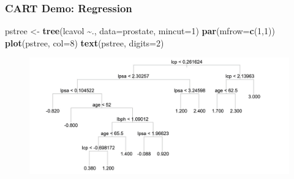\documentclass[
  shownotes,
  xcolor={svgnames},
  hyperref={colorlinks,citecolor=DarkBlue,linkcolor=DarkRed,urlcolor=DarkBlue}
  ]{beamer}
\newenvironment{Shaded}{\begin{snugshade}}{\end{snugshade}}
\newcommand{\DataTypeTok}[1]{\textcolor[rgb]{0.13,0.29,0.53}{#1}}
\newcommand{\DecValTok}[1]{\textcolor[rgb]{0.00,0.00,0.81}{#1}}
\newcommand{\KeywordTok}[1]{\textcolor[rgb]{0.13,0.29,0.53}{\textbf{#1}}}
\newcommand{\NormalTok}[1]{#1}
\newcommand{\OperatorTok}[1]{\textcolor[rgb]{0.81,0.36,0.00}{\textbf{#1}}}
\newcommand{\StringTok}[1]{\textcolor[rgb]{0.31,0.60,0.02}{#1}}
\begin{document}
\begin{frame}[fragile]
\frametitle{CART Demo: Regression}

\begin{scriptsize}
\begin{Shaded}
\begin{Highlighting}[]
\NormalTok{pstree \textless{}{-}}\StringTok{ }\KeywordTok{tree}\NormalTok{(lcavol }\OperatorTok{\textasciitilde{}}\NormalTok{., }\DataTypeTok{data=}\NormalTok{prostate, }\DataTypeTok{mincut=}\DecValTok{1}\NormalTok{)}
\KeywordTok{par}\NormalTok{(}\DataTypeTok{mfrow=}\KeywordTok{c}\NormalTok{(}\DecValTok{1}\NormalTok{,}\DecValTok{1}\NormalTok{))}
\KeywordTok{plot}\NormalTok{(pstree, }\DataTypeTok{col=}\DecValTok{8}\NormalTok{)}
\KeywordTok{text}\NormalTok{(pstree, }\DataTypeTok{digits=}\DecValTok{2}\NormalTok{)}
\end{Highlighting}
\end{Shaded}
\end{scriptsize}


\begin{figure}[H] \centering
            \captionsetup{justification=centering}
              \includegraphics[scale=0.15]{figures/tree_cancer}
 \end{figure}
\end{frame}
\end{document}
